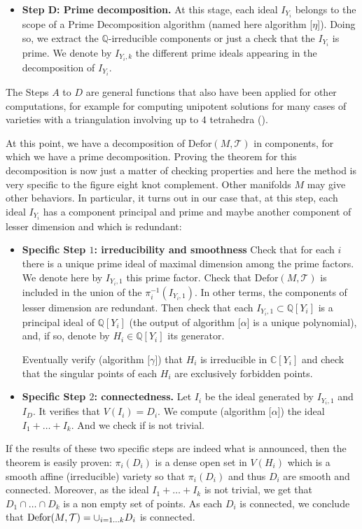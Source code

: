 \begin{itemize}
  \item {\bf Step D: Prime decomposition.} At this stage, each ideal $I_{Y_{i}}$ belongs to 
  the scope of a Prime Decomposition algorithm (named here algorithm [$\eta$]). Doing so, we 
  extract the $\mathbb{Q}$-irreducible components or just a check that the $I_{Y_{i}}$ 
  is prime. We denote by $I_{Y_i,k}$ the different prime ideals appearing in the decomposition of $I_{Y_i}$. 
\end{itemize}


The Steps $A$ to $D$ are general functions that also have been applied
for other computations, for example for computing unipotent solutions for many
cases of varieties with a triangulation involving up to $4$ tetrahedra (\cite{FKR14}).

At this point, we have a decomposition of $\mathrm{Defor}(M,\mathcal T)$ in components, for which we have a prime decomposition. Proving the theorem for this decomposition is now just a matter of checking properties and here the method is very specific to the figure eight knot complement. Other manifolds $M$ may give other behaviors. In particular, it turns out in our case that, at this step, each ideal $I_{Y_i}$ has a component principal and prime and maybe another component of lesser dimension and which is redundant:
\begin{itemize}
  \item {\bf Specific Step $1$: irreducibility and smoothness} Check that for each $i$ there is a unique prime ideal of maximal dimension among the prime factors. We denote here by $I_{Y_i,1}$ this prime factor. Check that $\mathrm{Defor}(M,\mathcal T)$ is included in the union of the $\pi_i^{-1}(I_{Y_i,1})$. In other terms, the components of lesser dimension are redundant. Then check that each $I_{Y_{i} ,1} \subset \mathbb{Q} [ Y_{i} ]$ is  a  principal ideal of $\mathbb{Q} [ Y_{i} ]$ (the output of algorithm
  [$\alpha$] is a unique polynomial), and, if so, denote by $H_{i} \in
  \mathbb{Q} [ Y_{i} ]$ its generator.
  
  Eventually verify (algorithm [$\gamma$]) that $H_{i}$ is irreducible in
  $\mathbb{C} [ Y_{i} ]$ and check that the singular points of each $H_{i}$
  are exclusively forbidden points.
  
  \item {\bf Specific Step $2$: connectedness.} Let $I_{i}$ be the ideal generated by $I_{Y_i,1}$ and $I_D$. It verifies that $V ( I_{i} ) =D_{i}$. We compute (algorithm [$\alpha$]) the ideal $I_{1} + \ldots +I_{k}$. And we check if is not trivial.
\end{itemize}
If the results of these two specific steps are indeed what is announced, then the theorem is easily proven: $\pi_{i} ( D_{i} )$ is a dense open
  set in $V ( H_{i} )$ which is a smooth affine (irreducible) variety so that
  $\pi_{i} ( D_{i} )$ and thus $D_{i}$ are smooth and connected. Moreover,  as the ideal $I_{1} + \ldots +I_{k}$ is not trivial, we get that $D_{1} \cap \ldots \cap D_{k}$ is a non empty 
  set of points. As each $D_i$ is connected, we conclude that $\operatorname{Defor} ( M, \mathcal{T} ) = \cup_{i=1 \ldots k} D_{i}$ is connected. 



